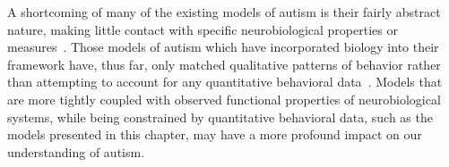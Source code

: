 A shortcoming of many of the existing models of autism is their fairly abstract nature, making little contact with specific neurobiological properties or measures~\cite{CohenIL:1994:AutismLearning,McClellandJL:2000:Autism,OLoughlinC:2000:Coherence}. Those models of autism which have incorporated biology into their framework have, thus far, only matched qualitative patterns of behavior rather than attempting to account for any quantitative behavioral data~\cite{GustafssonL:1997:AutismMaps,RefWorks:146}. Models that are more tightly coupled with observed functional properties of neurobiological systems, while being constrained by quantitative behavioral data, such as the models presented in this chapter, may have a more profound impact on our understanding of autism.
